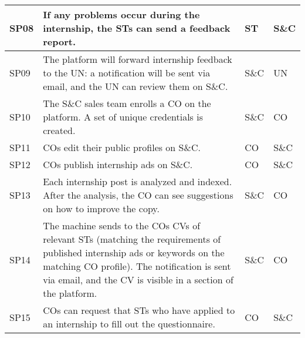 \begin{longtable}{|l|p{}|l|l|}
    \hline
    SP08               & If any problems occur during the internship, the STs can send a feedback report.                                                                                                                                                                      & ST         & S\&C     \\
    \hline
    SP09               & The platform will forward internship feedback to the UN: a notification will be sent via email, and the UN can review them on S\&C.                                                                                                                   & S\&C       & UN       \\
    \hline
    SP10               & The S\&C sales team enrolls a CO on the platform. A set of unique credentials is created.                                                                                                                                                             & S\&C       & CO       \\
    \hline
    SP11               & COs edit their public profiles on S\&C.                                                                                                                                                                                                               & CO         & S\&C     \\
    \hline
    SP12               & COs publish internship ads on S\&C.                                                                                                                                                                                                                   & CO         & S\&C     \\
    \hline
    SP13               & Each internship post is analyzed and indexed. After the analysis, the CO can see suggestions on how to improve the copy.                                                                                                                              & S\&C       & CO       \\
    \hline
    SP14               & The machine sends to the COs CVs of relevant STs (matching the requirements of published internship ads or keywords on the matching CO profile). The notification is sent via email, and the CV is visible in a section of the platform.              & S\&C       & CO       \\
    \hline
    SP15               & COs can request that STs who have applied to an internship to fill out the questionnaire.                                                                                                                                                             & CO         & S\&C     \\

\end{longtable}

